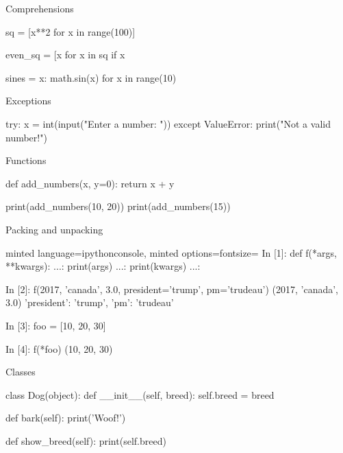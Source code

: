 \documentclass[noamssymb,svgnames]{beamer}
\begin{document}
\begin{frame}[fragile]{Comprehensions}
  \begin{python}
    sq = [x**2 for x in range(100)]

    even_sq = [x for x in sq if x %

    sines = {x: math.sin(x) for x in range(10)}
  \end{python}
\end{frame}

\begin{frame}[fragile]{Exceptions}
  \begin{python}
      try:
          x = int(input("Enter a number: "))
      except ValueError:
          print("Not a valid number!")
  \end{python}
\end{frame}

\begin{frame}[fragile]{Functions}
  \begin{python}
      def add_numbers(x, y=0):
          return x + y

      print(add_numbers(10, 20))
      print(add_numbers(15))
  \end{python}
\end{frame}

\begin{frame}[fragile]{Packing and unpacking}
  \begin{tcblisting}{minted language=ipythonconsole,
      minted options={fontsize=\footnotesize}}
      In [1]: def f(*args, **kwargs):
         ...:     print(args)
         ...:     print(kwargs)
         ...:

      In [2]: f(2017, 'canada', 3.0, president='trump',
                pm='trudeau')
      (2017, 'canada', 3.0)
      {'president': 'trump', 'pm': 'trudeau'}

      In [3]: foo = [10, 20, 30]

      In [4]: f(*foo)
      (10, 20, 30)
      {}
  \end{tcblisting}
\end{frame}

\begin{frame}[fragile]{Classes}
  \begin{python}
      class Dog(object):
          def __init__(self, breed):
              self.breed = breed

          def bark(self):
              print('Woof!')

          def show_breed(self):
              print(self.breed)
  \end{python}
\end{frame}
\end{document}
